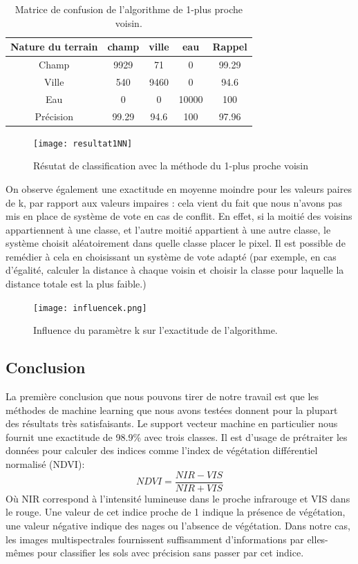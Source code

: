 \documentclass[a4paper,10pt]{report}
\begin{document}
\begin{table}
\begin{center}
 \begin{tabular}{|c|c|c|c|c|}
  \hline
  Nature du terrain & champ & ville & eau & Rappel \\
  \hline
Champ & 9929 & 71 & 	0 &	99.29 \\
Ville & 540 &	9460 &	0 &	94.6 \\
Eau &  0 &	0 &	10000 &	100 \\
Précision & 99.29 & 94.6 & 100 & 97.96 \\
  \hline
\end{tabular}
\end{center}
\label{table:1NN}
\caption{Matrice de confusion de l'algorithme de 1-plus proche voisin.}
\end{table}

\begin{figure}
  \centering
    \texttt{[image: resultat1NN]}
  \caption{Résutat de classification avec la méthode du 1-plus proche voisin}
  \label{fig:1NN}
\end{figure}

On observe également une exactitude en moyenne moindre pour les valeurs paires de k, par rapport aux valeurs impaires : cela vient du fait que nous n'avons pas mis en place de système de vote en cas de conflit. En effet, si la moitié des voisins appartiennent à une classe, et l'autre moitié appartient à une autre classe, le système choisit aléatoirement dans quelle classe placer le pixel. Il est possible de remédier à cela en choisissant un système de vote adapté (par exemple, en cas d'égalité, calculer la distance à chaque voisin et choisir la classe pour laquelle la distance totale est la plus faible.)

\begin{figure}
  \centering
    \texttt{[image: influencek.png]}
  \caption{Influence du paramètre k sur l'exactitude de l'algorithme.}
  \label{fig:kNN}
\end{figure}

\subsection{Conclusion}
La première conclusion que nous pouvons tirer de notre travail est que les méthodes de machine learning que nous avons testées donnent pour la plupart des résultats très satisfaisants. Le support vecteur machine en particulier nous fournit une exactitude de 98.9\% avec trois classes. Il est d'usage de prétraiter les données pour calculer des indices comme l'index de végétation différentiel normalisé (NDVI)\cite{NDVI}:
\begin{equation}
NDVI=\frac{NIR-VIS}{NIR+VIS}
\end{equation}
Où NIR correspond à l'intensité lumineuse dans le proche infrarouge et VIS dans le rouge. Une valeur de cet indice proche de 1 indique la présence de végétation, une valeur négative indique des nages ou l'absence de végétation. Dans notre cas, les images multispectrales fournissent suffisamment d'informations par elles-mêmes pour classifier les sols avec précision sans passer par cet indice.
\end{document}
